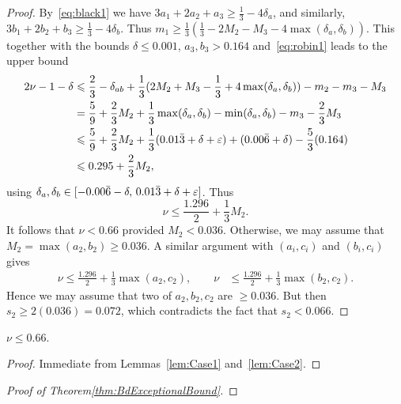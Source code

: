 \begin{proof}
  By~\eqref{eq:black1} we have $3a_1 + 2a_2 + a_3 \ge \frac{1}{3}-4\delta_a$, and similarly,
  $3b_1 + 2b_2 +b_3 \ge \frac{1}{3}-4\delta_b$. Thus $m_1 \ge \frac{1}{3}(\frac{1}{3}-2M_2 - M_3-4\max(\delta_a,\delta_b))$.
  This together with the bounds $\delta\leq 0.001$, $a_3,b_3>0.164$ and~\eqref{eq:robin1} leads to the upper bound
  \begin{align*}
    2\nu-1 -\delta
    & \leqslant \frac{2}{3}
    -\delta_{ab}
    + \frac{1}{3}(2M_2 + M_3-\frac{1}{3}+4\max(\delta_a,\delta_b)) - m_2 - m_3 - M_3 \\
    & = \frac{5}{9} + \frac{2}{3}M_2
    +\frac{1}{3}\max(\delta_a,\delta_b)- \min(\delta_a,\delta_b)
    - m_3 - \frac{2}{3}M_3 \\
    &\leqslant \frac{5}{9} + \frac{2}{3}M_2+
    \frac{1}{3}(0.01\bar{3}+\delta+\varepsilon) + (0.00\bar{6}+\delta)
    - \frac{5}{3}(0.164)\\
    &\leqslant 0.295+\frac{2}{3}M_2,
  \end{align*}
  using $\delta_a,\delta_b\in [-0.00\bar{6}-\delta,\, 0.01\bar{3}+\delta+\varepsilon]$.
  Thus
  \[
  \nu\leq \frac{1.296}{2}+\frac{1}{3}M_2.
  \]
  It follows that
  $\nu< 0.66$ provided $M_2 < 0.036$.
  Otherwise, we may assume that $M_2=\max(a_2,b_2) \geq 0.036$.
  A similar argument with $(a_i,c_i)$ and $(b_i,c_i)$ gives
  \begin{align*}
  \nu
  \leq \frac{1.296}{2}+\frac{1}{3}\max(a_2,c_2),\qquad
  \nu & \leq \frac{1.296}{2}+ \frac{1}{3}\max(b_2,c_2).
  \end{align*}
  Hence we may assume that two of $a_2,b_2,c_2$ are $\geq 0.036$. But then $s_2 \geq 2( 0.036) = 0.072$, which contradicts the fact that $s_2< 0.066$.
\end{proof}

\begin{theorem}\label{thm:ABCExponentNu}
  $\nu \le 0.66$.
\end{theorem}
\begin{proof}
  Immediate from Lemmas~\ref{lem:Case1} and~\ref{lem:Case2}.
\end{proof}

\begin{proof}[Proof of Theorem\ref{thm:BdExceptionalBound}]
\end{proof}


